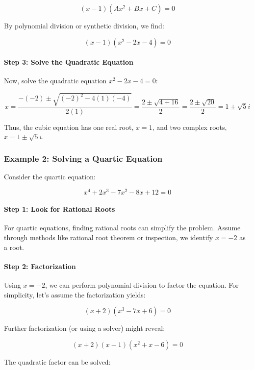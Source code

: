\documentclass[
]{article}
\begin{document}
\[ (x - 1)(Ax^2 + Bx + C) = 0 \]

By polynomial division or synthetic division, we find:

\[ (x - 1)(x^2 - 2x - 4) = 0 \]

\paragraph{Step 3: Solve the Quadratic
Equation}\label{step-3-solve-the-quadratic-equation}

Now, solve the quadratic equation \(x^2 - 2x - 4 = 0\):

\[ x = \frac{-(-2) \pm \sqrt{(-2)^2 - 4(1)(-4)}}{2(1)} = \frac{2 \pm \sqrt{4 + 16}}{2} = \frac{2 \pm \sqrt{20}}{2} = 1 \pm \sqrt{5}i \]

Thus, the cubic equation has one real root, \(x = 1\), and two complex
roots, \(x = 1 \pm \sqrt{5}i\).

\subsubsection{Example 2: Solving a Quartic
Equation}\label{example-2-solving-a-quartic-equation}

Consider the quartic equation:

\[ x^4 + 2x^3 - 7x^2 - 8x + 12 = 0 \]

\paragraph{Step 1: Look for Rational
Roots}\label{step-1-look-for-rational-roots}

For quartic equations, finding rational roots can simplify the problem.
Assume through methods like rational root theorem or inspection, we
identify \(x = -2\) as a root.

\paragraph{Step 2: Factorization}\label{step-2-factorization-1}

Using \(x = -2\), we can perform polynomial division to factor the
equation. For simplicity, let's assume the factorization yields:

\[ (x + 2)(x^3 - 7x + 6) = 0 \]

Further factorization (or using a solver) might reveal:

\[ (x + 2)(x - 1)(x^2 + x - 6) = 0 \]

The quadratic factor can be solved:
\end{document}
